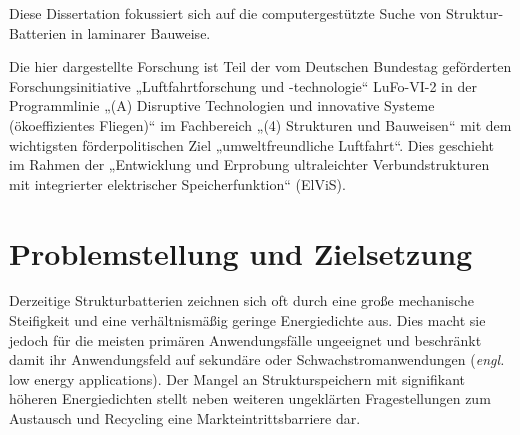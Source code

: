Diese Dissertation fokussiert sich auf die computergestützte Suche von Struktur-Batterien in laminarer Bauweise.

Die hier dargestellte Forschung ist Teil der vom Deutschen Bundestag geförderten Forschungsinitiative „Luftfahrtforschung und -technologie“ LuFo-VI-2 in der Programmlinie „(A) Disruptive Technologien und innovative Systeme (ökoeffizientes Fliegen)“ im Fachbereich „(4) Strukturen und Bauweisen“ mit dem wichtigsten förderpolitischen Ziel „umweltfreundliche Luftfahrt“. Dies geschieht im Rahmen der „Entwicklung und Erprobung ultraleichter Verbundstrukturen mit integrierter elektrischer Speicherfunktion“ (ElViS).


\section{\label{sec:Motivation_Zielstellung}Problemstellung und Zielsetzung}



Derzeitige Strukturbatterien zeichnen sich oft durch eine große mechanische Steifigkeit und eine verhältnismäßig geringe Energiedichte aus. Dies macht sie jedoch für die meisten primären Anwendungsfälle ungeeignet und beschränkt damit ihr Anwendungsfeld auf sekundäre oder Schwachstromanwendungen (\textit{engl.} low energy applications). Der Mangel an Strukturspeichern mit signifikant höheren Energiedichten stellt neben weiteren ungeklärten Fragestellungen zum Austausch und Recycling eine Markteintrittsbarriere dar.

